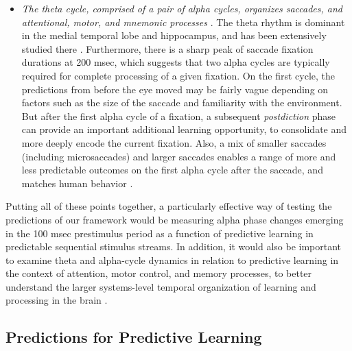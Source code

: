 \documentclass[11pt,twoside]{article}
\newif\myifpdf
\begin{document}
\begin{itemize}
	\item \emph{The theta cycle, comprised of a pair of alpha cycles, organizes saccades, and attentional, motor, and mnemonic processes} \citep{FiebelkornKastner19}.  The theta rhythm is dominant in the medial temporal lobe and hippocampus, and has been extensively studied there \citep{KahanaSeeligMadsen01,Buzsaki05}.  Furthermore, there is a  sharp peak of saccade fixation durations at 200 msec, which suggests that two alpha cycles are typically required for  complete processing of a given fixation.  On the first cycle, the predictions from before the eye moved may be fairly vague depending on factors such as the size of the saccade and familiarity with the environment.  But after the first alpha cycle of a fixation, a subsequent \emph{postdiction} phase can provide an important additional learning opportunity, to consolidate and more deeply encode the current fixation.  Also, a mix of smaller saccades (including microsaccades) and larger saccades enables a range of more and less predictable outcomes on the first alpha cycle after the saccade, and matches human behavior \citep{Martinez-CondeOtero-MillanMacknik13,Martinez-CondeMacknikHubel04}.
	
\end{itemize}

Putting all of these points together, a particularly effective way of testing the predictions of our framework would be measuring alpha phase changes emerging in the 100 msec prestimulus period as a function of predictive learning in predictable sequential stimulus streams.  In addition, it would also be important to examine theta and alpha-cycle dynamics in relation to predictive learning in the context of attention, motor control, and memory processes, to better understand the larger systems-level temporal organization of learning and processing in the brain \citep{FiebelkornKastner19}.

\subsection{Predictions for Predictive Learning}
\end{document}
